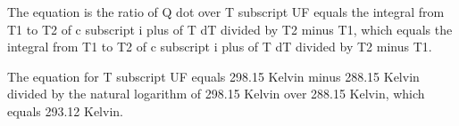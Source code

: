 The equation is the ratio of Q dot over T subscript UF equals the integral from T1 to T2 of c subscript i plus of T dT divided by T2 minus T1, which equals the integral from T1 to T2 of c subscript i plus of T dT divided by T2 minus T1.

The equation for T subscript UF equals 298.15 Kelvin minus 288.15 Kelvin divided by the natural logarithm of 298.15 Kelvin over 288.15 Kelvin, which equals 293.12 Kelvin.